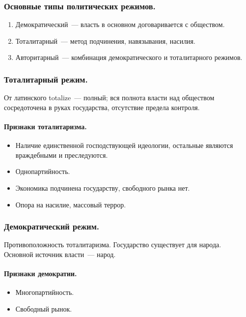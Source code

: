 \documentclass[12pt]{article}
\begin{document}
	\subsubsection{Основные типы политических режимов.}
	\begin{enumerate}
		\item Демократический~--- власть в основном договаривается с обществом.
		\item Тоталитарный~--- метод подчинения, навязывания, насилия.
		\item Авторитарный~--- комбинация демократического и тоталитарного режимов.
	\end{enumerate}
	\subsubsection{Тоталитарный режим.}
	\begin{definition}
		От латинского totalize~--- полный; вся полнота власти над обществом сосредоточена в руках государства, отсутствие предела контроля.
	\end{definition}
	\paragraph{Признаки тоталитаризма.}
	\begin{itemize}
		\item Наличие единственной господствующей идеологии, остальные являются враждебными и преследуются.
		\item Однопартийность.
		\item Экономика подчинена государству, свободного рынка нет.
		\item Опора на насилие, массовый террор.
	\end{itemize}
	\subsubsection{Демократический режим.}
	\begin{definition}
		Противоположность тоталитаризма. Государство существует для народа. Основной источник власти~--- народ.
	\end{definition}
	\paragraph{Признаки демократии.}
	\begin{itemize}
		\item Многопартийность.
		\item Свободный рынок.
	\end{itemize}
\end{document}
